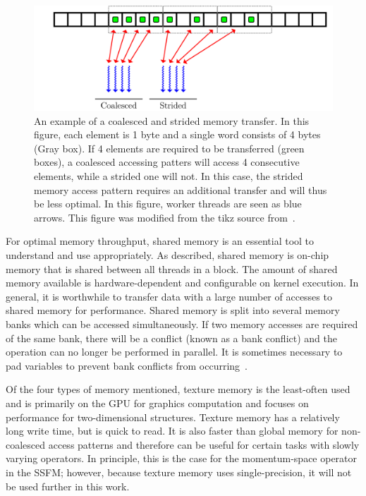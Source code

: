 \begin{figure}
\includegraphics[width=\textwidth]{data/gpu/coalesce/check.pdf}
\caption{An example of a coalesced and strided memory transfer.
In this figure, each element is 1 byte and a single word consists of 4 bytes (Gray box).
If 4 elements are required to be transferred (green boxes), a coalesced accessing patters will access 4 consecutive elements, while a strided one will not.
In this case, the strided memory access pattern requires an additional transfer and will thus be less optimal.
In this figure, worker threads are seen as blue arrows.
This figure was modified from the tikz source from~\cite{stackoverflow}.}
\label{fig:coalesce}
\end{figure}

For optimal memory throughput, shared memory is an essential tool to understand and use appropriately.
As described, shared memory is on-chip memory that is shared between all threads in a block.
The amount of shared memory available is hardware-dependent and configurable on kernel execution.
In general, it is worthwhile to transfer data with a large number of accesses to shared memory for performance.
Shared memory is split into several memory banks which can be accessed simultaneously.
If two memory accesses are required of the same bank, there will be a conflict (known as a bank conflict) and the operation can no longer be performed in parallel.
It is sometimes necessary to pad variables to prevent bank conflicts from occurring~\cite{harris2013}.

Of the four types of memory mentioned, texture memory is the least-often used and is primarily on the GPU for graphics computation and focuses on performance for two-dimensional structures.
Texture memory has a relatively long write time, but is quick to read.
It is also faster than global memory for non-coalesced access patterns and therefore can be useful for certain tasks with slowly varying operators.
In principle, this is the case for the momentum-space operator in the SSFM; however, because texture memory uses single-precision, it will not be used further in this work.

